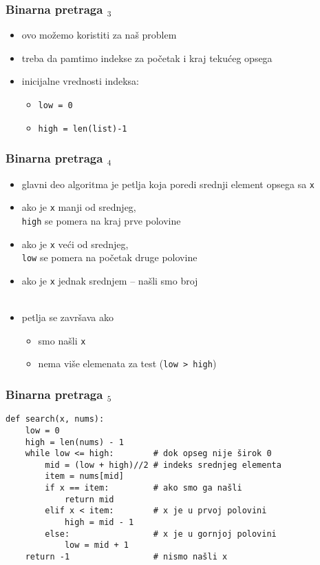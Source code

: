 \documentclass[utf8,compress,aspectratio=169]{beamer}
\begin{document}
\begin{frame}[fragile]
  \frametitle{Binarna pretraga $_3$}
  \begin{itemize}
    \item ovo možemo koristiti za naš problem
    \item treba da pamtimo indekse za početak i kraj tekućeg opsega
    \item inicijalne vrednosti indeksa:
    \begin{itemize}
      \item \texttt{low = 0}
      \item \texttt{high = len(list)-1}
    \end{itemize}
  \end{itemize}
\end{frame}

\begin{frame}[fragile]
  \frametitle{Binarna pretraga $_4$}
  \begin{itemize}
    \item glavni deo algoritma je petlja koja poredi srednji element opsega sa \texttt{x}
    \item ako je \texttt{x} manji od srednjeg, \\ \texttt{high} se pomera na kraj prve polovine
    \item ako je \texttt{x} veći od srednjeg, \\ \texttt{low} se pomera na početak druge polovine
    \item ako je \texttt{x} jednak srednjem -- našli smo broj \\ \ \\
    \item petlja se završava ako
    \begin{itemize}
      \item smo našli \texttt{x}
      \item nema više elemenata za test (\texttt{low > high})
    \end{itemize}
  \end{itemize}
\end{frame}

\begin{frame}[fragile]
  \frametitle{Binarna pretraga $_5$}
\begin{verbatim}
def search(x, nums):
    low = 0
    high = len(nums) - 1
    while low <= high:        # dok opseg nije širok 0
        mid = (low + high)//2 # indeks srednjeg elementa
        item = nums[mid]
        if x == item:         # ako smo ga našli
            return mid
        elif x < item:        # x je u prvoj polovini
            high = mid - 1
        else:                 # x je u gornjoj polovini
            low = mid + 1
    return -1                 # nismo našli x
\end{verbatim}
\end{frame}
\end{document}
